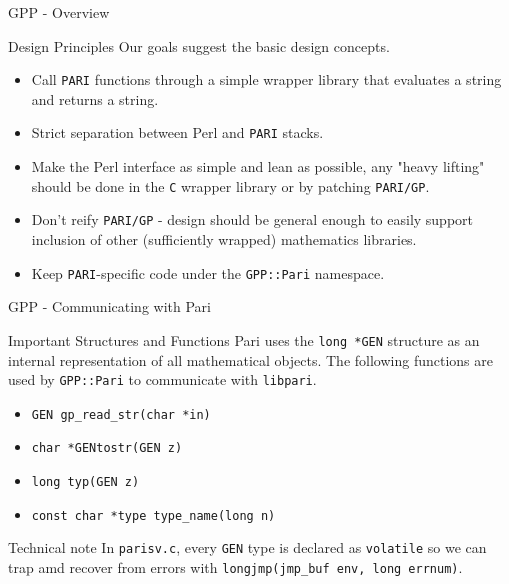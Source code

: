 \documentclass{beamer}
\begin{document}
\begin{frame}{GPP - Overview}

\begin{block}{Design Principles}
Our goals suggest the basic design concepts.
\end{block}

\begin{itemize}
	\item Call \texttt{PARI} functions through a simple wrapper library that evaluates a string and returns a string.
    \item Strict separation between Perl and \texttt{PARI} stacks.
    \item Make the Perl interface as simple and lean as possible, any "heavy lifting" should be done in the \texttt{C} wrapper library or by patching \texttt{PARI/GP}.
    \item Don't reify \texttt{PARI/GP} - design should be general enough to easily support inclusion of other (sufficiently wrapped) mathematics libraries.
    \item Keep \texttt{PARI}-specific code under the \texttt{GPP::Pari} namespace.
\end{itemize}

\end{frame}

\begin{frame}{GPP - Communicating with Pari}
\begin{block}{Important Structures and Functions}
Pari uses the \texttt{long *GEN} structure as an internal representation of all mathematical objects. The following functions are used by \texttt{GPP::Pari} to communicate with \texttt{libpari}.
\end{block}
\begin{itemize}
	\item \texttt{GEN gp\_read\_str(char *in)}
	\item \texttt{char *GENtostr(GEN z)}
	\item \texttt{long typ(GEN z)}
	\item \texttt{const char *type type\_name(long n)}
\end{itemize}
\begin{block}{Technical note}
In \texttt{parisv.c}, every \texttt{GEN} type is declared as \texttt{volatile} so we can trap amd recover from errors with \texttt{longjmp(jmp\_buf env, long errnum)}.
\end{block}

\end{frame}
\end{document}

